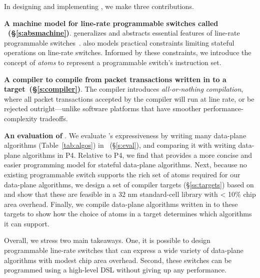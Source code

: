 In designing and implementing \pktlanguage, we make three contributions.
\begin{CompactEnumerate}
\item \textbf{A machine model for line-rate programmable switches called
  \absmachine~(\S\ref{s:absmachine})}.  \absmachine generalizes and abstracts
  essential features of line-rate programmable switches~\cite{rmt, xpliant,
  flexpipe}. \absmachine also models practical constraints limiting stateful
  operations on line-rate switches.  Informed by these constraints, we
  introduce the concept of {\em atoms} to represent a programmable switch's
  instruction set.

\item \textbf{A compiler to compile from packet transactions written in \pktlanguage to
  a \absmachine target~(\S\ref{s:compiler})}. The \pktlanguage compiler
  introduces \textit{all-or-nothing compilation}, where all packet transactions
  accepted by the compiler will run at line rate, or be rejected
  outright---unlike software platforms that have smoother
  performance-complexity tradeoffs.

\item \textbf{An evaluation of \pktlanguage}. We evaluate \pktlanguage's
  expressiveness by writing many data-plane algorithms (Table~\ref{tab:algos})
  in \pktlanguage~(\S\ref{s:eval}), and comparing it with writing data-plane
  algorithms in P4.  Relative to P4, we find that \pktlanguage provides a more
  concise and easier programming model for stateful data-plane algorithms.
  Next, because no existing programmable switch supports the rich set of atoms
  required for our data-plane algorithms, we design a set of compiler targets
  (\S\ref{ss:targets}) based on \absmachine and show that these are feasible in
  a 32 nm standard-cell library with < 10\% chip area overhead.  Finally, we
  compile data-plane algorithms written in \pktlanguage to these targets to
  show how the choice of atoms in a target determines which algorithms it can
  support.
\end{CompactEnumerate}

Overall, we stress two main takeaways. One, it is possible to design
programmable line-rate switches that can express a wide variety of data-plane
algorithms with modest chip area overhead. Second, these switches can be
programmed using a high-level DSL without giving up any performance.
